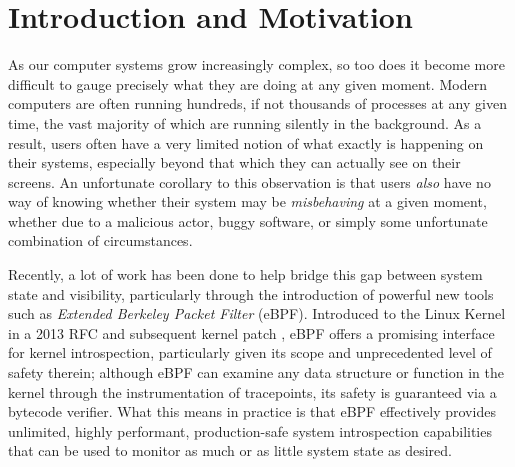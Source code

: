 \documentclass[
  12pt]{findlay}
\begin{document}
\singlespacing

\newpage
\begingroup
\hypersetup{linkcolor=black}
\tableofcontents

\newpage
\listoffigures
\newpage
\listoftables
\newpage
\lstlistoflistings
\endgroup

\onehalfspacing

\newpage
{}
\setcounter{page}{1}

\hypertarget{introduction-and-motivation}{%
\section{Introduction and
Motivation}\label{introduction-and-motivation}}

As our computer systems grow increasingly complex, so too does it become
more difficult to gauge precisely what they are doing at any given
moment. Modern computers are often running hundreds, if not thousands of
processes at any given time, the vast majority of which are running
silently in the background. As a result, users often have a very limited
notion of what exactly is happening on their systems, especially beyond
that which they can actually see on their screens. An unfortunate
corollary to this observation is that users \emph{also} have no way of
knowing whether their system may be \emph{misbehaving} at a given
moment, whether due to a malicious actor, buggy software, or simply some
unfortunate combination of circumstances.

Recently, a lot of work has been done to help bridge this gap between
system state and visibility, particularly through the introduction of
powerful new tools such as \emph{Extended Berkeley Packet Filter}
(eBPF). Introduced to the Linux Kernel in a 2013 RFC and subsequent
kernel patch \autocite{starovoitov13,starovoitov14}, eBPF offers a
promising interface for kernel introspection, particularly given its
scope and unprecedented level of safety therein; although eBPF can
examine any data structure or function in the kernel through the
instrumentation of tracepoints, its safety is guaranteed via a bytecode
verifier. What this means in practice is that eBPF effectively provides
unlimited, highly performant, production-safe system introspection
capabilities that can be used to monitor as much or as little system
state as desired.
\end{document}
